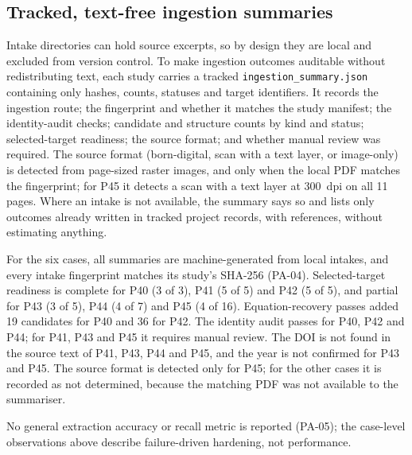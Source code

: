 \subsection{Tracked, text-free ingestion summaries}
Intake directories can hold source excerpts, so by design they are local and excluded from version control. To make ingestion outcomes auditable without redistributing text, each study carries a tracked \texttt{ingestion\_summary.json} containing only hashes, counts, statuses and target identifiers. It records the ingestion route; the fingerprint and whether it matches the study manifest; the identity-audit checks; candidate and structure counts by kind and status; selected-target readiness; the source format; and whether manual review was required. The source format (born-digital, scan with a text layer, or image-only) is detected from page-sized raster images, and only when the local PDF matches the fingerprint; for P45 it detects a scan with a text layer at 300~dpi on all 11 pages. Where an intake is not available, the summary says so and lists only outcomes already written in tracked project records, with references, without estimating anything.

For the six cases, all summaries are machine-generated from local intakes, and every intake fingerprint matches its study's SHA-256 (PA-04). Selected-target readiness is complete for P40 (3 of 3), P41 (5 of 5) and P42 (5 of 5), and partial for P43 (3 of 5), P44 (4 of 7) and P45 (4 of 16). Equation-recovery passes added 19 candidates for P40 and 36 for P42. The identity audit passes for P40, P42 and P44; for P41, P43 and P45 it requires manual review. The DOI is not found in the source text of P41, P43, P44 and P45, and the year is not confirmed for P43 and P45. The source format is detected only for P45; for the other cases it is recorded as not determined, because the matching PDF was not available to the summariser.

No general extraction accuracy or recall metric is reported (PA-05); the case-level observations above describe failure-driven hardening, not performance.
